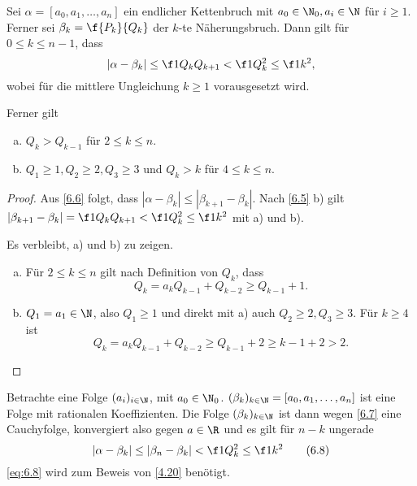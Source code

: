 \begin{st} \label{6.7}
	Sei $\alpha = [a_0, a_1, \dotsc, a_n]$ ein endlicher Kettenbruch mit $a_0 \in \N_0, a_i \in \N$ für $i \ge 1$.
	Ferner sei $\beta_k = \f {P_k}{Q_k}$ der $k$-te Näherungsbruch.
	Dann gilt für $0 \le k \le n-1$, dass
	\[
		| \alpha - \beta_k | \le \f 1{Q_k Q_{k+1}} < \f 1{Q_k^2} \le \f 1{k^2},
	\]
	wobei für die mittlere Ungleichung $k \ge 1$ vorausgesetzt wird.

	Ferner gilt
	\begin{enumerate}[a)]
		\item
			$Q_k > Q_{k-1}$ für $2 \le k \le n$.
		\item
			$Q_1 \ge 1, Q_2 \ge 2, Q_3 \ge 3$ und $Q_k > k$ für $4 \le k \le n$.
	\end{enumerate}
	\begin{proof}
		Aus \ref{6.6} folgt, dass $|\alpha - \beta_k| \le |\beta_{k+1} - \beta_k|$.
		Nach \ref{6.5} b) gilt $|\beta_{k+1} - \beta_k| = \f 1{Q_k Q_{k+1}} < \f 1{Q_k^2} \le \f 1{k^2}$ mit a) und b).

		Es verbleibt, a) und b) zu zeigen.
		\begin{enumerate}[a)]
			\item
				Für $2 \le k \le n$ gilt nach Definition von $Q_k$, dass
				\[
					Q_k = a_k Q_{k-1} + Q_{k-2}
					\ge Q_{k-1} + 1.
				\]
			\item
				$Q_1 = a_1 \in \N$, also $Q_1 \ge 1$ und direkt mit a) auch $Q_2 \ge 2, Q_3 \ge 3$.
				Für $k \ge 4$ ist
				\[
					Q_k = a_k Q_{k-1} + Q_{k-2}
					\ge Q_{k-1} + 2
					\ge k - 1 + 2
					> 2.
				\]
		\end{enumerate}
	\end{proof}
\end{st}

Betrachte eine Folge $(a_i)_{i \in \N}$, mit $a_0 \in \N_0$.
$(\beta_k)_{k\in\N} = [a_0, a_1, \dotsc, a_n]$ ist eine Folge mit rationalen Koeffizienten.
Die Folge $(\beta_k)_{k \in \N}$ ist dann wegen \ref{6.7} eine Cauchyfolge, konvergiert also gegen $a \in \R$ und es gilt für $n - k$ ungerade
\begin{equation}
	\label{eq:6.8}
	|\alpha - \beta_k| \le | \beta_n - \beta_k| < \f 1{Q_k^2} \le \f 1{k^2}
	\tag{6.8}
\end{equation}
\eqref{eq:6.8} wird zum Beweis von \ref{4.20} benötigt.
